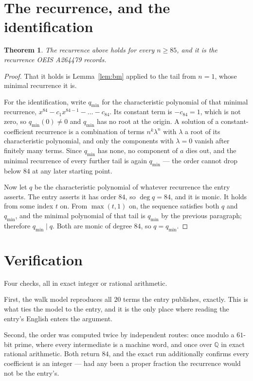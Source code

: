 \documentclass[11pt,a4paper]{article}
\theoremstyle{plain}
\newtheorem{theorem}{Theorem}
\theoremstyle{definition}
\begin{document}
\section{The recurrence, and the identification}

\begin{theorem}
The recurrence above holds for every $n\ge85$, and it is the recurrence OEIS A264479 records.
\end{theorem}

\begin{proof}
That it holds is Lemma~\ref{lem:bm} applied to the tail from $n=1$, whose minimal
recurrence it is.

For the identification, write $q_{\min}$ for the characteristic polynomial of that minimal
recurrence, $x^{84}-c_1x^{84-1}-\dots-c_{84}$. Its constant term is
$-c_{84}=1$, which is not zero, so $q_{\min}(0)\neq0$ and $q_{\min}$ has no
root at the origin. A solution of a constant-coefficient recurrence is a combination of terms
$n^{k}\lambda^{n}$ with $\lambda$ a root of its characteristic polynomial, and only the
components with $\lambda=0$ vanish after finitely many terms. Since $q_{\min}$ has none, no
component of $a$ dies out, and the minimal recurrence of every further tail is again
$q_{\min}$ --- the order cannot drop below $84$ at any later starting point.

Now let $q$ be the characteristic polynomial of whatever recurrence the entry asserts. The
entry asserts it has order $84$, so $\deg q=84$, and it is monic. It holds from some
index $t$ on. From $\max(t,1)$ on, the sequence satisfies both $q$ and $q_{\min}$, and
the minimal polynomial of that tail is $q_{\min}$ by the previous paragraph; therefore
$q_{\min}\mid q$. Both are monic of degree $84$, so $q=q_{\min}$.
\end{proof}

\section{Verification}

Four checks, all in exact integer or rational arithmetic.

First, the walk model reproduces all $20$ terms the entry publishes, exactly. This is
what ties the model to the entry, and it is the only place where reading the entry's English
enters the argument.

Second, the order was computed twice by independent routes: once modulo a $61$-bit prime, where
every intermediate is a machine word, and once over $\mathbb{Q}$ in exact rational arithmetic.
Both return $84$, and the exact run additionally confirms every coefficient is an integer
--- had any been a proper fraction the recurrence would not be the entry's.
\end{document}
